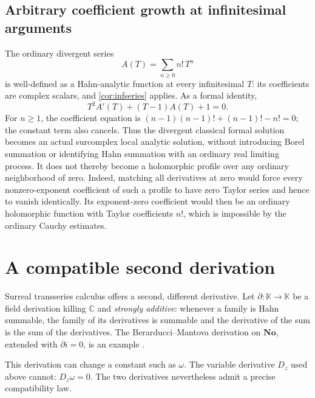 \documentclass[11pt,a4paper]{article}
\numberwithin{equation}{section}
\theoremstyle{definition}
\newcommand{\No}{\mathbf{No}}
\newcommand{\K}{\mathbb K}
\newcommand{\C}{\mathbb C}
\begin{document}
\subsection{Arbitrary coefficient growth at infinitesimal arguments}

The ordinary divergent series
\[
 A(T)=\sum_{n\geq0}n!\,T^n
\]
is well-defined as a Hahn-analytic function at every infinitesimal $T$:
its coefficients are complex scalars, and \cref{cor:infseries} applies.
As a formal identity,
\begin{equation}\label{eq:factorialODE}
 T^2 A'(T)+(T-1)A(T)+1=0.
\end{equation}
For $n\geq1$, the coefficient equation is
$(n-1)(n-1)!+(n-1)!-n!=0$; the constant term also cancels.
Thus the divergent classical formal solution becomes an actual surcomplex
local analytic solution, without introducing Borel summation or identifying
Hahn summation with an ordinary real limiting process.
It does not thereby become a holomorphic profile over any ordinary
neighborhood of zero. Indeed, matching all derivatives at zero would force
every nonzero-exponent coefficient of such a profile to have zero Taylor
series and hence to vanish identically. Its exponent-zero coefficient would
then be an ordinary holomorphic function with Taylor coefficients $n!$,
which is impossible by the ordinary Cauchy estimates.

\section{A compatible second derivation}
\label{sec:derivations}

Surreal transseries calculus offers a second, different derivative. Let
$\partial:\K\to\K$ be a field derivation killing $\C$ and \emph{strongly
additive}: whenever a family is Hahn summable, the family of its derivatives
is summable and the derivative of the sum is the sum of the derivatives.
The Berarducci--Mantova derivation on $\No$, extended with $\partial i=0$,
is an example \cite{BMder}.

This derivation can change a constant such as $\omega$. The variable derivative
$D_z$ used above cannot: $D_z\omega=0$. The two derivatives nevertheless admit
a precise compatibility law.
\end{document}
